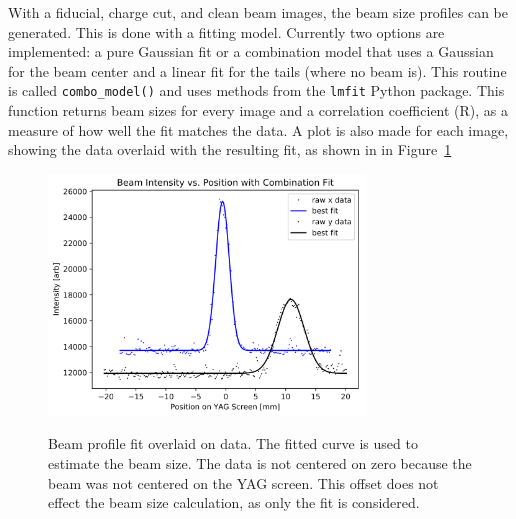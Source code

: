 With a fiducial, charge cut, and clean beam images, the beam size profiles can be generated.
This is done with a fitting model. Currently two options are implemented:
a pure Gaussian fit or a combination model that uses a Gaussian for 
the beam center and a linear fit for the tails (where no beam is).
This routine is called \verb|combo_model()| and uses methods from 
the \verb|lmfit| Python package.
This function returns beam sizes for every image and 
a correlation coefficient (R), as a measure of how well the fit matches the data. 
A plot is also made for each image, showing the data overlaid with 
the resulting fit, as shown in in Figure~\ref{fig:combo}
\begin{figure}
	\centering
	\includegraphics[width=0.75\textwidth]{images/combomodel}
	\label{fig:combo}
	\caption{Beam profile fit overlaid on data. 
		The fitted curve is used to estimate the beam size.
	The data is not centered on zero because the beam was not centered on the YAG screen.
	This offset does not effect the beam size calculation, as only the fit is considered.}
\end{figure}

